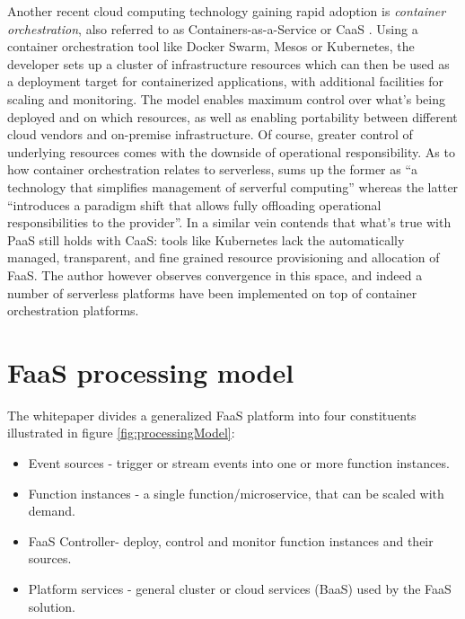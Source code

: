 Another recent cloud computing technology gaining rapid adoption is \textit{container orchestration}, also referred to as Containers-as-a-Service or CaaS \parencite{cncf18serverlessWG}. Using a container orchestration tool like Docker Swarm, Mesos or Kubernetes, the developer sets up a cluster of infrastructure resources which can then be used as a deployment target for containerized applications, with additional facilities for scaling and monitoring. The model enables maximum control over what's being deployed and on which resources, as well as enabling portability between different cloud vendors and on-premise infrastructure. Of course, greater control of underlying resources comes with the downside of operational responsibility. As to how container orchestration relates to serverless, \textcite{jonas19berkeleyView} sums up the former as ``a technology that simplifies management of serverful computing'' whereas the latter ``introduces a paradigm shift that allows fully offloading operational responsibilities to the provider''. In a similar vein \textcite{robert2016serverlessarchitectures} contends that what's true with PaaS still holds with CaaS: tools like Kubernetes lack the automatically managed, transparent, and fine grained resource provisioning and allocation of FaaS. The author however observes convergence in this space, and indeed a number of serverless platforms have been implemented on top of container orchestration platforms.

\section{FaaS processing model} \label{sec:processingModel}

The \textcite{cncf18serverlessWG} whitepaper divides a generalized FaaS platform into four constituents illustrated in figure \ref{fig:processingModel}:

\begin{itemize}
  \item Event sources - trigger or stream events into one or more function instances.
  \item Function instances - a single function/microservice, that can be scaled with demand.
  \item FaaS Controller- deploy, control and monitor function instances and their sources.
  \item Platform services - general cluster or cloud services (BaaS) used by the FaaS solution.
\end{itemize}

